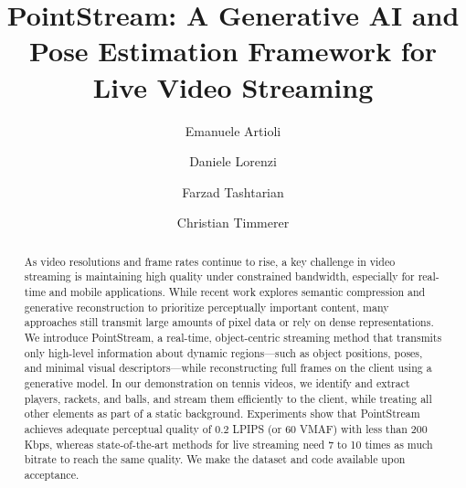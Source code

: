 \documentclass[manuscript, screen]{acmart}
\begin{document}
\title[PointStream]{PointStream: A Generative AI and Pose Estimation Framework for Live Video Streaming}

\author{Emanuele Artioli}
\author{Daniele Lorenzi}
\author{Farzad Tashtarian}
\author{Christian Timmerer}

\begin{abstract}
As video resolutions and frame rates continue to rise, a key challenge in video streaming is maintaining high quality under constrained bandwidth, especially for real-time and mobile applications. While recent work explores semantic compression and generative reconstruction to prioritize perceptually important content, many approaches still transmit large amounts of pixel data or rely on dense representations. We introduce PointStream, a real-time, object-centric streaming method that transmits only high-level information about dynamic regions—such as object positions, poses, and minimal visual descriptors—while reconstructing full frames on the client using a generative model. In our demonstration on tennis videos, we identify and extract players, rackets, and balls, and stream them efficiently to the client, while treating all other elements as part of a static background. Experiments show that PointStream achieves adequate perceptual quality of 0.2 LPIPS (or 60 VMAF) with less than 200 Kbps, whereas state-of-the-art methods for live streaming need 7 to 10 times as much bitrate to reach the same quality. We make the dataset and code available upon acceptance.
\end{abstract}

\renewcommand{\shortauthors}{Emanuele Artioli, Daniele Lorenzi, Farzad Tashtarian, \& Christian Timmerer}
\end{document}
